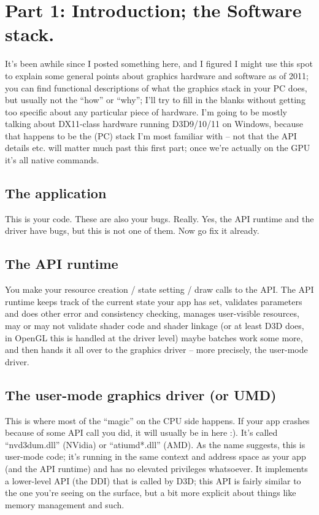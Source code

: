 \documentclass[12pt]{article}
\begin{document}
\section{Part 1: Introduction; the Software stack.}
\label{sec:org43ce506}
\label{part1}

It’s been awhile since I posted something here, and I figured I might use this spot to explain some general points about graphics hardware and software as of 2011; you can find functional descriptions of what the graphics stack in your PC does, but usually not the “how” or “why”; I’ll try to fill in the blanks without getting too specific about any particular piece of hardware.
I’m going to be mostly talking about DX11-class hardware running D3D9/10/11 on Windows, because that happens to be the (PC) stack I’m most familiar with – not that the API details etc.
will matter much past this first part; once we’re actually on the GPU it’s all native commands.

\subsection{The application}
\label{sec:org7ca2668}
This is your code. These are also your bugs. Really. Yes, the API runtime and the driver have bugs, but this is not one of them. Now go fix it already.

\subsection{The API runtime}
\label{sec:orgbb46ce7}
You make your resource creation / state setting / draw calls to the API. The API runtime keeps track of the current state your app has set, validates parameters and does other error and consistency checking, manages user-visible resources, may or may not validate shader code and shader linkage (or at least D3D does, in OpenGL this is handled at the driver level) maybe batches work some more, and then hands it all over to the graphics driver – more precisely, the user-mode driver.

\subsection{The user-mode graphics driver (or UMD)}
\label{sec:org44a27d8}
This is where most of the “magic” on the CPU side happens.
If your app crashes because of some API call you did, it will usually be in here :).
It’s called “nvd3dum.dll” (NVidia) or “atiumd*.dll” (AMD).
As the name suggests, this is user-mode code; it’s running in the same context and address space as your app (and the API runtime) and has no elevated privileges whatsoever.
It implements a lower-level API (the DDI) that is called by D3D; this API is fairly similar to the one you’re seeing on the surface, but a bit more explicit about things like memory management and such.
\end{document}
